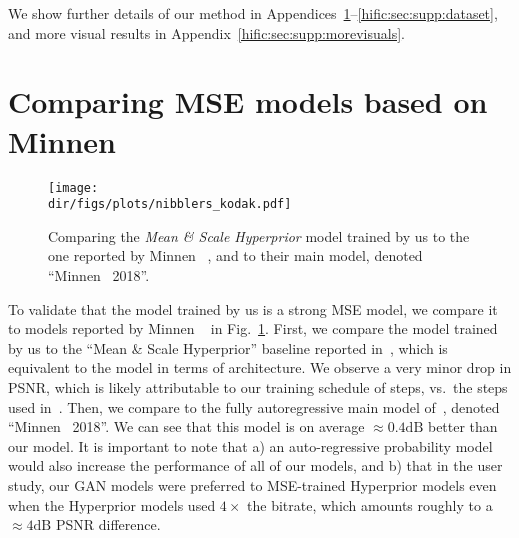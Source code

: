 \begin{subappendices} 
\appendixheader




We show further details of our method in Appendices~\ref{hific:sec:supp:nibblerperf}--\ref{hific:sec:supp:dataset}, and more visual results in Appendix~\ref{hific:sec:supp:morevisuals}.


% 
%
    \section{Comparing MSE models based on Minnen 
    \etal \texorpdfstring{\cite{minnen2018joint}}{2018}
    }
\label{hific:sec:supp:nibblerperf}

\begin{figure}[ht]
    \centering
    \texttt{[image: \\dir/figs/plots/nibblers\_kodak.pdf]}
    \caption{Comparing the \emph{Mean \& Scale Hyperprior} model trained by us to the one reported by Minnen \etal~\cite{minnen2018joint}, and to their main model, denoted ``Minnen \etal\ 2018''.}
    \label{hific:fig:nibblers}
\end{figure}

To validate that the \eblminnen model trained by us is a strong MSE model,
we compare it to models reported by Minnen \etal~\cite{minnen2018joint} in Fig.~\ref{hific:fig:nibblers}. 
First, we compare the model trained by us to the ``Mean \& Scale Hyperprior'' baseline reported in~\cite{minnen2018joint}, which is equivalent to the \eblminnen model in terms of architecture. We observe a very minor drop in PSNR, which is likely attributable to our training schedule of  steps, vs.\ the  steps used in~\cite{minnen2018joint}. Then, we compare to the fully autoregressive main model of~\cite{minnen2018joint}, denoted ``Minnen \etal\ 2018''. We can see that this model is on average ${\approx}0.4\text{dB}$ better than our \eblminnen model. It is important to note that a) an auto-regressive probability model would also increase the performance of all of our models, and b) that in the user study, our GAN models were preferred to MSE-trained Hyperprior models even when the Hyperprior models used $4{\times}$ the bitrate, which amounts roughly to a ${\approx}4\text{dB}$ PSNR difference.



\end{subappendices}
